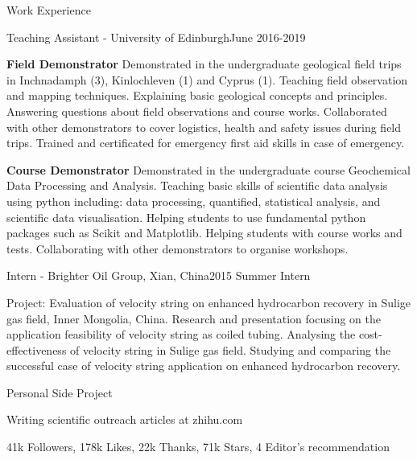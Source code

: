\documentclass{resume} %
\newenvironment{indentpar}[1]%
  {\begin{list}{}%
          {\setlength{\leftmargin}{#1}}%
          \item[]%
  }
  {\end{list}}
\begin{document}
\begin{rSection}{Work Experience}

\begin{rSubsection}{Teaching Assistant - University of Edinburgh}{June 2016-2019}{}

\begin{indentpar}{0.5cm}
\textbf{Field Demonstrator} Demonstrated in the undergraduate geological field trips in Inchnadamph (3), Kinlochleven (1) and Cyprus (1). Teaching field observation and mapping techniques. Explaining basic geological concepts and principles. Answering questions about field observations and course works. Collaborated with other demonstrators to cover logistics, health and safety issues during field trips. Trained and certificated for emergency first aid skills in case of emergency.

\textbf{Course Demonstrator} Demonstrated in the undergraduate course Geochemical Data Processing and Analysis. Teaching basic skills of scientific data analysis using python including: data processing, quantified, statistical analysis, and scientific data visualisation. Helping students to use fundamental python packages such as Scikit and Matplotlib. Helping students with course works and tests. Collaborating with other demonstrators to organise workshops.
\end{indentpar}
\end{rSubsection}

\begin{rSubsection}{Intern - Brighter Oil Group, Xian, China}{2015 Summer Intern}{}

\begin{indentpar}{0.5cm}
Project: Evaluation of velocity string on enhanced hydrocarbon recovery in Sulige gas field, Inner Mongolia, China. Research and presentation focusing on the application feasibility of velocity string as coiled tubing. Analysing the cost-effectiveness of velocity string in Sulige gas field. Studying and comparing the successful case of velocity string application on enhanced hydrocarbon recovery.
\end{indentpar}

\end{rSubsection}
\end{rSection}

\begin{rSection}{Personal Side Project}
\begin{rSubsection}{Writing scientific outreach articles at zhihu.com}{}{}

\begin{indentpar}{0.6cm}
41k Followers, 178k Likes, 22k Thanks, 71k Stars, 4 Editor's recommendation
\end{indentpar}

\end{rSubsection}


\end{rSection}

\end{document}
